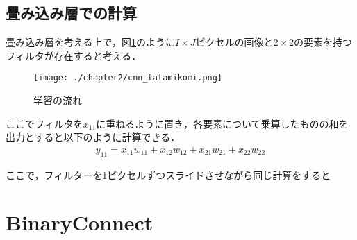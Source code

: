 \subsection{畳み込み層での計算}
畳み込み層を考える上で，図\ref{fig_conv}のように$I \times J$ピクセルの画像と$2 \times 2$の要素を持つフィルタが存在すると考える．
\begin{figure}[]
  \begin{center}
    \texttt{[image: ./chapter2/cnn\_tatamikomi.png]}
    \caption{学習の流れ}
    \label{fig_conv}
  \end{center}
\end{figure}
ここでフィルタを$x_{11}$に重ねるように置き，各要素について乗算したものの和を出力とすると以下のように計算できる．
\begin{align*}
  y_{11} = x_{11}w_{11} + x_{12}w_{12} + x_{21}w_{21} + x_{22}w_{22}
\end{align*}

ここで，フィルターを1ピクセルずつスライドさせながら同じ計算をすると

\section{BinaryConnect}

